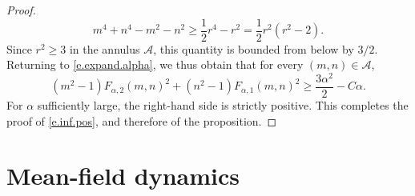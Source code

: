 \documentclass[11pt]{amsart}
\theoremstyle{remark}
\theoremstyle{definition}
\numberwithin{equation}{section}
\numberwithin{proposition}{section}
\renewcommand{\ge}{\geqslant}
\newcommand{\1}{\mathbf{1}}
\newcommand{\mcl}{\mathcal}
\newcommand{\al}{\alpha}
\begin{document}
\begin{proof}
\begin{equation*}  %
m^4 + n^4 - m^2 - n^2 \ge \frac 1 2 r^4 - r^2 = \frac 1 2 r^2(r^2-2). 
\end{equation*}
Since $r^2 \ge 3$ in the annulus $\mcl A$, this quantity is bounded from below by $3/2$. Returning to \eqref{e.expand.alpha}, we thus obtain that for every $(m,n) \in \mcl A$,
\begin{equation*}
(m^2 - 1) F_{\al,2}(m,n)^2 + (n^2 - 1) F_{\al,1}(m,n)^2 \ge \frac{3\al^2}{2} - C\al.
\end{equation*}
For $\al$ sufficiently large, the right-hand side is strictly positive. This completes the proof of \eqref{e.inf.pos}, and therefore of the proposition. 
\end{proof}




%
%
%
%
%
%

\section{Mean-field dynamics}
\label{s.toy}
\end{document}
